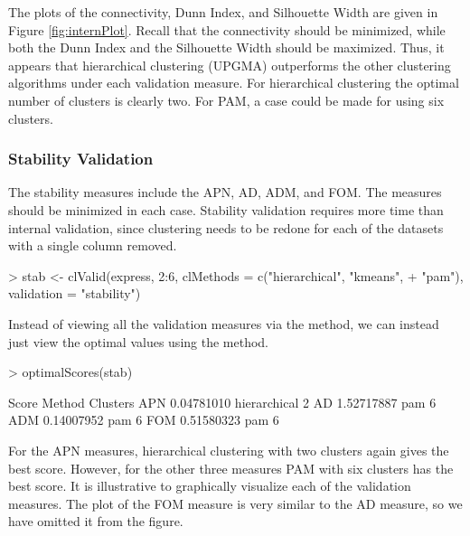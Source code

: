 \documentclass[11pt]{article}
\begin{document}
The plots of the connectivity, Dunn Index, and Silhouette Width are given in 
Figure \ref{fig:internPlot}.
Recall that the connectivity should be minimized, while both the Dunn
Index and the Silhouette Width should be maximized.  Thus, it appears
that hierarchical clustering (UPGMA) 
outperforms the other clustering algorithms under each validation
measure.
For hierarchical clustering the optimal number of clusters is clearly
two.  For PAM, a case could be made for using six clusters.


\subsubsection*{Stability Validation}

The stability measures include the APN, AD, ADM, and FOM.  The
measures should be minimized in each case.  Stability validation
requires more time than internal validation, since clustering needs to
be redone for each of the datasets with a single column removed.  

\begin{Schunk}
\begin{Sinput}
> stab <- clValid(express, 2:6, clMethods = c("hierarchical", "kmeans", 
+     "pam"), validation = "stability")
\end{Sinput}
\end{Schunk}

Instead of viewing all the validation measures via the 
method, we can instead just view the optimal values using the
 method.

\begin{Schunk}
\begin{Sinput}
> optimalScores(stab)
\end{Sinput}
\begin{Soutput}
         Score       Method Clusters
APN 0.04781010 hierarchical        2
AD  1.52717887          pam        6
ADM 0.14007952          pam        6
FOM 0.51580323          pam        6
\end{Soutput}
\end{Schunk}

For the APN measures, hierarchical clustering with two
clusters again gives the best score.  However, for the other three
measures PAM with six clusters has the best score.  It
is illustrative to graphically visualize each of the validation
measures.  The plot of the FOM measure is very similar to the AD measure, so we
have omitted it from the figure.
\end{document}
